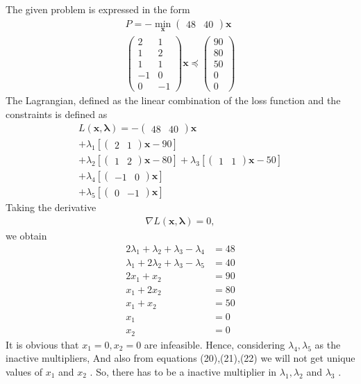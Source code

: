 \documentclass[journal,12pt,twocolumn]{IEEEtran}
\newcommand{\myvec}[1]{\ensuremath{\begin{pmatrix}#1\end{pmatrix}}}
\let\vec\mathbf
\begin{document}
\begin{enumerate}
        The given problem is expressed in the form 
        \begin{align}
	        P = -\min_{\vec{x}}\myvec{48 & 40}\vec{x} \\
	        \myvec{2 & 1 \\ 1 & 2 \\ 1 & 1 \\ -1 & 0 \\ 0 & -1} \vec{x}\preceq \myvec{90 \\ 80 \\50 \\ 0 \\0}
        \end{align}
        The Lagrangian, defined as the linear combination of the loss function and the constraints is defined as
        \begin{multline}
	        L\left({\vec{x},\bm{\lambda}}\right) =-\myvec{48 & 40}\vec{x} \\
	        + \lambda_1\left[{\myvec{2 & 1}\vec{x}-90}\right] \\
    	    + \lambda_2\left[{\myvec{1 & 2}\vec{x}-80}\right]
    	    + \lambda_3\left[{\myvec{1 & 1}\vec{x}-50}\right] \\
            + \lambda_4\left[{\myvec{-1 & 0}\vec{x}}\right] \\
            + \lambda_5\left[{\myvec{0 & -1}\vec{x}}\right]
        \end{multline}
        Taking the derivative
        \begin{align}
	        {\nabla L\left({\vec{x},\bm{\lambda}}\right)} = 0,
        \end{align}
        we obtain 
        \begin{align}
        	2\lambda_1 + \lambda_2 + \lambda_3 - \lambda_4 &= 48 \\
        	\lambda_1 + 2\lambda_2 + \lambda_3 - \lambda_5 &= 40 \\
        	2x_1 + x_2 &= 90 \\
        	x_1 + 2x_2 &= 80 \\
        	x_1 + x_2 &= 50 \\
        	x_1 &= 0 \\
        	x_2 &= 0
        \end{align}
        It is obvious that $x_1=0, x_2=0$ are infeasible.  Hence, considering $\lambda_4, \lambda_5$ as the inactive multipliers, And also from equations (20),(21),(22) we will not get unique values of $x_1$ and $x_2$ . So, there has to be a inactive multiplier in  $\lambda_1, \lambda_2$ and $\lambda_3$ .


\end{enumerate}
\end{document}
